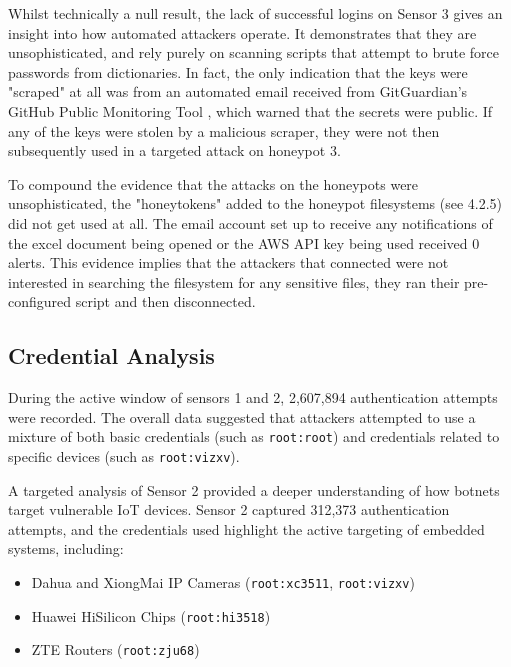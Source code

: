 \documentclass[]{article}
\begin{document}

Whilst technically a null result, the lack of successful logins on Sensor 3 gives an insight into how automated attackers operate. It demonstrates that they are unsophisticated, and rely purely on scanning scripts that attempt to brute force passwords from dictionaries. In fact, the only indication that the keys were "scraped" at all was from an automated email received from GitGuardian's GitHub Public Monitoring Tool \cite{gitguardian}, which warned that the secrets were public. If any of the keys were stolen by a malicious scraper, they were not then subsequently used in a targeted attack on honeypot 3.

To compound the evidence that the attacks on the honeypots were unsophisticated, the "honeytokens" added to the honeypot filesystems (see 4.2.5) did not get used at all. The email account set up to receive any notifications of the excel document being opened or the AWS API key being used received 0 alerts. This evidence implies that the attackers that connected were not interested in searching the filesystem for any sensitive files, they ran their pre-configured script and then disconnected.

\subsection{Credential Analysis}

During the active window of sensors 1 and 2, 2,607,894 authentication attempts were recorded. The overall data suggested that attackers attempted to use a mixture of both basic credentials (such as \texttt{root:root}) and credentials related to specific devices (such as \texttt{root:vizxv}).

A targeted analysis of Sensor 2 provided a deeper understanding of how botnets target vulnerable IoT devices. Sensor 2 captured 312,373 authentication attempts, and the credentials used highlight the active targeting of embedded systems, including:

\begin{itemize}
	\item Dahua and XiongMai IP Cameras (\texttt{root:xc3511}, \texttt{root:vizxv})
	\item Huawei HiSilicon Chips (\texttt{root:hi3518})
	\item ZTE Routers (\texttt{root:zju68})
\end{itemize}
\end{document}
